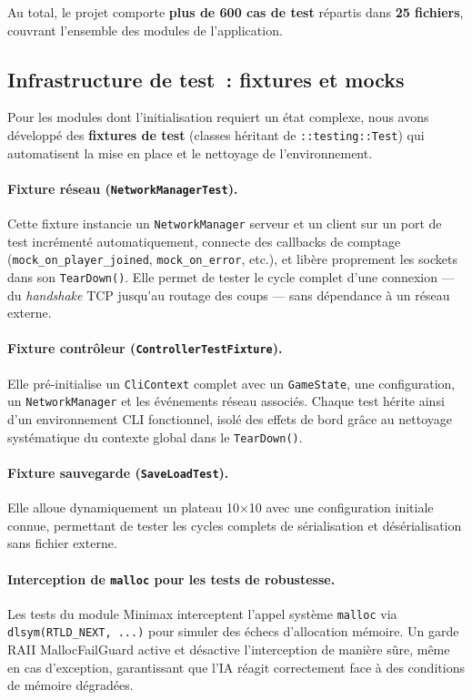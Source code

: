 \documentclass[a4paper]{article}
\begin{document}
Au total, le projet comporte \textbf{plus de 600 cas de test} répartis dans
\textbf{25 fichiers}, couvrant l'ensemble des modules de l'application.
 
 
\subsection{Infrastructure de test~: fixtures et mocks}
 
Pour les modules dont l'initialisation requiert un état complexe, nous avons
développé des \textbf{fixtures de test} (classes héritant de
\texttt{::testing::Test}) qui automatisent la mise en place et le nettoyage
de l'environnement.
 
\paragraph{Fixture réseau (\texttt{NetworkManagerTest}).}
Cette fixture instancie un \texttt{NetworkManager} serveur et un client sur
un port de test incrémenté automatiquement, connecte des callbacks de
comptage (\texttt{mock\_on\_player\_joined}, \texttt{mock\_on\_error}, etc.),
et libère proprement les sockets dans son \texttt{TearDown()}. Elle permet
de tester le cycle complet d'une connexion --- du \textit{handshake} TCP
jusqu'au routage des coups --- sans dépendance à un réseau externe.
 
\paragraph{Fixture contrôleur (\texttt{ControllerTestFixture}).}
Elle pré-initialise un \texttt{CliContext} complet avec un \texttt{GameState},
une configuration, un \texttt{NetworkManager} et les événements réseau
associés. Chaque test hérite ainsi d'un environnement CLI fonctionnel,
isolé des effets de bord grâce au nettoyage systématique du contexte global
dans le \texttt{TearDown()}.
 
\paragraph{Fixture sauvegarde (\texttt{SaveLoadTest}).}
Elle alloue dynamiquement un plateau 10$\times$10 avec une configuration
initiale connue, permettant de tester les cycles complets de sérialisation
et désérialisation sans fichier externe.
 
\paragraph{Interception de \texttt{malloc} pour les tests de robustesse.}
Les tests du module Minimax interceptent l'appel système \texttt{malloc}
via \texttt{dlsym(RTLD\_NEXT, ...)} pour simuler des échecs d'allocation
mémoire. Un garde RAII {MallocFailGuard} active et désactive
l'interception de manière sûre, même en cas d'exception, garantissant que
l'IA réagit correctement face à des conditions de mémoire dégradées.
 
\end{document}
